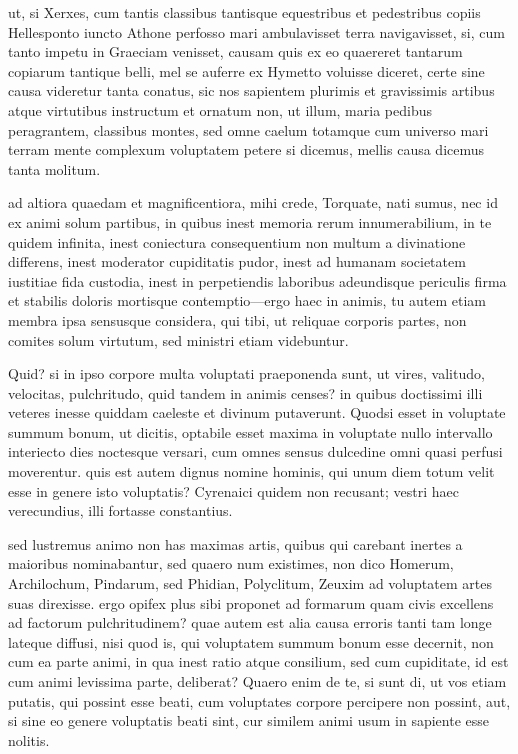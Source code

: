  ut, si Xerxes, cum tantis classibus tantisque equestribus et pedestribus copiis Hellesponto iuncto Athone perfosso mari ambulavisset terra navigavisset, si, cum tanto impetu in Graeciam venisset, causam quis ex eo quaereret tantarum copiarum tantique belli, mel se auferre ex Hymetto voluisse diceret, certe sine causa videretur tanta conatus, sic nos sapientem plurimis et gravissimis artibus atque virtutibus instructum et ornatum non, ut illum, maria pedibus peragrantem, classibus montes, sed omne caelum totamque cum universo mari terram mente complexum voluptatem petere si dicemus, mellis causa dicemus tanta molitum.

 ad altiora quaedam et magnificentiora, mihi crede, Torquate, nati sumus, nec id ex animi solum partibus, in quibus inest memoria rerum innumerabilium, in te quidem infinita, inest coniectura consequentium non multum a divinatione differens, inest moderator cupiditatis pudor, inest ad humanam societatem iustitiae fida custodia, inest in perpetiendis laboribus adeundisque periculis firma et stabilis doloris mortisque contemptio—ergo haec in animis, tu autem etiam membra ipsa sensusque considera, qui tibi, ut reliquae corporis partes, non comites solum virtutum, sed ministri etiam videbuntur.

 Quid? si in ipso corpore multa voluptati praeponenda sunt, ut vires, valitudo, velocitas, pulchritudo, quid tandem in animis censes? in quibus doctissimi illi veteres inesse quiddam caeleste et divinum putaverunt. Quodsi esset in voluptate summum bonum, ut dicitis, optabile esset maxima in voluptate nullo intervallo interiecto dies noctesque versari, cum omnes sensus dulcedine omni quasi perfusi moverentur. quis est autem dignus nomine hominis, qui unum diem totum velit esse in genere isto voluptatis? Cyrenaici quidem non recusant; vestri haec verecundius, illi fortasse constantius.

 sed lustremus animo non has maximas artis, quibus qui carebant inertes a maioribus nominabantur, sed quaero num existimes, non dico Homerum, Archilochum, Pindarum, sed Phidian, Polyclitum, Zeuxim ad voluptatem artes suas direxisse. ergo opifex plus sibi proponet ad formarum quam civis excellens ad factorum pulchritudinem? quae autem est alia causa erroris tanti tam longe lateque diffusi, nisi quod is, qui voluptatem summum bonum esse decernit, non cum ea parte animi, in qua inest ratio atque consilium, sed cum cupiditate, id est cum animi levissima parte, deliberat? Quaero enim de te, si sunt di, ut vos etiam putatis, qui possint esse beati, cum voluptates corpore percipere non possint, aut, si sine eo genere voluptatis beati sint, cur similem animi usum in sapiente esse nolitis.

